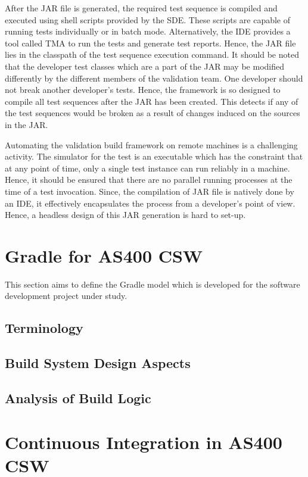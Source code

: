 \documentclass[12pt, a4paper, titlepage]{scrartcl}
\begin{document}
\par After the JAR file is generated, the required test sequence is compiled and executed using shell scripts provided by the SDE. These scripts are capable of running tests individually or in batch mode. Alternatively, the IDE provides a tool called TMA to run the tests and generate test reports. Hence, the JAR file lies in the classpath of the test sequence execution command. It should be noted that the developer test classes which are a part of the JAR may be modified differently by the different members of the validation team. One developer should not break another developer's tests. Hence, the framework is so designed to compile all test sequences after the JAR has been created. This detects if any of the test sequences would be broken as a result of changes induced on the sources in the JAR. 
\par Automating the validation build framework on remote machines is a challenging activity. The simulator for the test is an executable which has the constraint that at any point of time, only a single test instance can run reliably in a machine. Hence, it should be ensured that there are no parallel running processes at the time of a test invocation. Since, the compilation of JAR file is natively done by an IDE, it effectively encapsulates the process from a developer's point of view. Hence, a headless design of this JAR generation is hard to set-up.  

\pagebreak
\section{Gradle for AS400 CSW}
 This section aims to define the Gradle model which is developed for the software development project under study. 
\subsection{Terminology} 
\subsection{Build System Design Aspects}
\subsection{Analysis of Build Logic}

\section{Continuous Integration in AS400 CSW}
\end{document}
